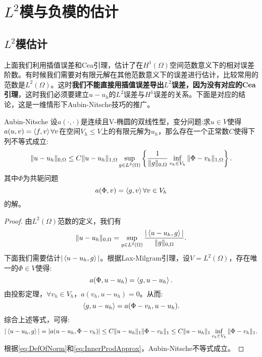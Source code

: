 \section{$L^{2}$模与负模的估计}
\subsection{$L^{2}$模估计}
上面我们利用插值误差和Cea引理，估计了在$H^{1}(\Omega)$空间范数意义下的相对误差阶数。有时候我们需要对有限元解在其他范数意义下的误差进行估计，比较常用的范数是$L^{2}(\Omega)$。这时\textbf{我们不能直接用插值误差导出$L^{2}$误差，因为没有对应的Cea引理}，这时我们必须要建立$u-u_{h}$的$L^{2}$误差与$H^{1}$误差的关系。下面是对应的结论，这是一维情形下Aubin-Nitsche技巧的推广。
\begin{theorem}{Aubin-Nitsche}
    设$a(\cdot,\cdot)$是连续且V-椭圆的双线性型，变分问题:求$u\in V$使得$a(u,v)=\left<f,v\right>\forall v$在空间$V_{h}\le V$上的有限元解为$u_{h}$，那么存在一个正常数$C$使得下列不等式成立:
    \begin{equation}
        \|u-u_{h}\|_{0,\Omega}\le C\|u-u_{h}\|_{1,\Omega}\sup_{g\in L^{2}(\Omega)}\left\{\frac{1}{\|g\|_{0,\Omega}}\inf_{v_{h}\in V_{h}}\|\Phi-v_{h}\|_{1,\Omega}\right\}.
    \end{equation}
    其中$\Phi$为共轭问题
    \begin{equation}
        a(\Phi,v)=\left<g,v\right>\forall v\in V_{h}
    \end{equation}
    的解。
\end{theorem}
\begin{proof}
    由$L^{2}(\Omega)$范数的定义，我们有
    \begin{equation}
        \label{eq:DefOfNorm}
        \|u-u_{h}\|_{0,\Omega}=\sup_{g\in L^{2}(\Omega)}\frac{|\left<u-u_{h},g\right>|}{\|g\|_{0,\Omega}}.
    \end{equation}
    下面我们需要估计$|\left<u-u_{h},g\right>|$。根据Lax-Milgram引理，设$V=L^{2}(\Omega)$，存在唯一的$\Phi\in V$使得:
    \begin{equation}
        \label{eq:LM}
        a(\Phi,u-u_{h})=\left<g,u-u_{h}\right>.
    \end{equation}
    由投影定理，$\forall v_{h}\in V_{h}$，$a(v_{h},u-u_{h})=0$。从而:
    \begin{equation}
        \left<g,u-u_{h}\right>=a(\Phi-v_{h},u-u_{h}).
    \end{equation}
    综合上述等式，可得:
    \begin{equation}
        \label{eq:InnerProdApprox}
        |\left<u-u_{h},g\right>|=|a(u-u_{h},\Phi-v_{h})|\le C\|u-u_{h}\|_{1}\|\Phi-v_{h}\|_{1}\le C\|u-u_{h}\|_{1}\inf_{v_{h}\in V_{h}}\|\Phi-v_{h}\|_{1}.
    \end{equation}
    根据\eqref{eq:DefOfNorm}和\eqref{eq:InnerProdApprox}，Aubin-Nitsche不等式成立。
\end{proof}
